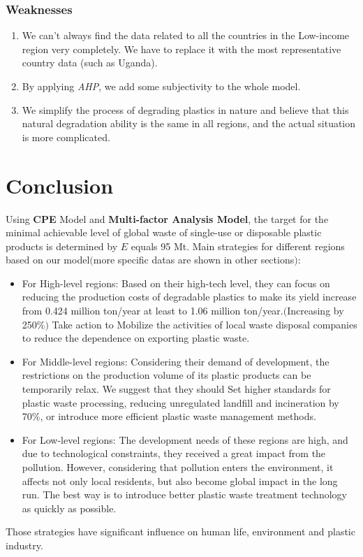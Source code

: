 \documentclass{mcmthesis}
\begin{document}
\subsubsection{Weaknesses}
   \begin{enumerate}
    \item We can't always find the data related to all the countries in the Low-income region very completely. We have to replace it with the most representative country data (such as Uganda).\\
    \item By applying \textit{AHP}, we add some subjectivity to the whole model.
    \item We simplify the process of degrading plastics in nature and believe that this natural degradation ability is the same in all regions, and the actual situation is more complicated.\\
   \end{enumerate}


\section{Conclusion}
  Using \textbf{CPE} Model and \textbf{Multi-factor Analysis Model}, the target for the minimal achievable level of global 
  waste of single-use or disposable plastic products is determined by $E$ equals 95 Mt.
  Main strategies for different regions based on our model$($more specific datas are shown in other sections$)$:
  \begin{itemize}
	\item \quad For High-level regions: Based on their high-tech level, they can focus on reducing the production costs of degradable plastics to make its yield increase from 0.424 million ton/year at least to 1.06 million ton/year.$($Increasing by 250\%$)$ Take action to Mobilize the activities of local waste disposal companies to reduce the dependence on exporting plastic waste.
	\item \quad For Middle-level regions: Considering their demand of development, the restrictions on the production volume of its plastic products can be temporarily relax. We suggest that they should Set higher standards for plastic waste processing, reducing unregulated landfill and incineration by 70\%, or introduce more efficient plastic waste management methods.
	
	\item \quad For Low-level regions: The development needs of these regions are high, and due to technological constraints, they received a great impact from the pollution. However, considering that pollution enters the environment, it affects not only local residents, but also become global impact in the long run. The best way is to introduce better plastic waste treatment technology as quickly as possible.
   
	\end{itemize}
	Those strategies have significant influence on human life, environment and plastic industry.
\end{document}
